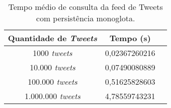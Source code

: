 \begin{table}[H]
    \centering
    \caption[Tempo médio de consulta da feed de Tweets com persistência monoglota]{Tempo médio de consulta da feed de Tweets com persistência monoglota.\label{tab:tempo_feed_mono}}
    \begin{tabular}{ccc}
        \hline
            Quantidade de \textit{Tweets} & Tempo (s) \\
        \hline
            1000 \textit{tweets} &   0,02367260216 \\
            10.000 \textit{tweets} & 0,07490080889 \\
            100.000 \textit{tweets} & 0,51625828603 \\
            1.000.000 \textit{tweets} & 4,78559743231 \\
        \hline
    \end{tabular}
\end{table}
